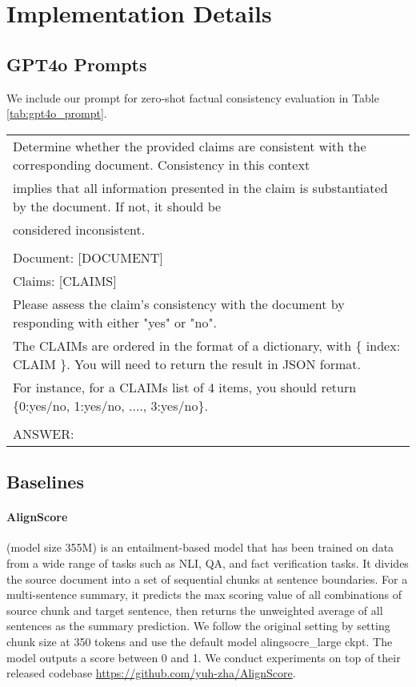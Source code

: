 \newpage
\clearpage
\section{Implementation Details}\label{appendix:implementation_details}

\subsection{GPT4o Prompts}
We include our prompt for zero-shot factual consistency evaluation in Table \ref{tab:gpt4o_prompt}.
\begin{table*}
\scriptsize
    \begin{center}
        \begin{tabular}{l}
        \toprule
             Determine whether the provided claims are consistent with the corresponding document. Consistency in this context\\
             implies that
    all information presented in the claim is substantiated by the document.  If not, it should be \\
    considered inconsistent.\\
    \\
    Document: [DOCUMENT]\\
    Claims: [CLAIMS] \\
    Please assess the claim’s consistency with the document by responding with either "yes" or "no".\\
    The CLAIMs are ordered in the format of a dictionary, with \{ index: CLAIM \}. You will need to return the result in JSON format.\\
    For instance, for a CLAIMs list of 4 items, you should return \{0:yes/no, 1:yes/no, ...., 3:yes/no\}.\\
\\
    ANSWER: \\
            \bottomrule
        \end{tabular}
        \caption{Zero-shot factual consistency evaluation prompt for GPT4o.}\label{tab:gpt4o_prompt}
    \end{center}
\end{table*}

\subsection{Baselines}
\paragraph{AlignScore} (model size 355M) \cite{zha-etal-2023-alignscore} is an entailment-based model that has been trained on data from a wide range of tasks such as NLI, QA, and fact verification tasks. It divides the source document into a set of sequential chunks at sentence boundaries. For a multi-sentence summary, it predicts the max scoring value of all combinations of source chunk and target sentence, then returns the unweighted average of all sentences as the summary prediction. We follow the original setting by setting chunk size at 350 tokens and use the default model alingsocre\_large ckpt. The model outputs a score between 0 and 1. We conduct experiments on top of their released codebase \url{https://github.com/yuh-zha/AlignScore}.
